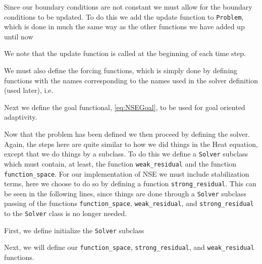     Since our boundary conditions are not constant we must allow for the
    boundary conditions to be updated. To do this we add the update function to
    \texttt{Problem}, which is done in much the same way as the other functions
    we have added up until now
    

    \begin{remark}
        We note that the update function is called at the beginning
        of each time step.
    \end{remark}

    We must also define the forcing functions, which is simply done by defining
    functions with the names corresponding to the names used in the solver
    definition (used later), i.e.
    

    Next we define the goal functional, \eqref{eq:NSEGoal}, to be used for goal
    oriented adaptivity.
    

    Now that the problem has been defined we then proceed by defining the
    solver. Again, the steps here are quite similar to how we did things in the
    Heat equation, except that we do things by a subclass.  To do this we define
    a \texttt{Solver} subclass which must contain, at least, the function
    \texttt{weak\_residual} and the function \texttt{function\_space}. For our
    implementation of NSE we must include stabilization terms, here we choose to
    do so by defining a function \texttt{strong\_residual}.  This can be seen in
    the following lines, since things are done through a \texttt{Solver}
    subclass passing of the functions \texttt{function\_space},
    \texttt{weak\_residual}, and \texttt{strong\_residual} to the
    \texttt{Solver} class is no longer needed.

    First, we define initialize the \texttt{Solver} subclass
    

    Next, we will define our \texttt{function\_space},
    \texttt{strong\_residual}, and \texttt{weak\_residual} functions.
    

